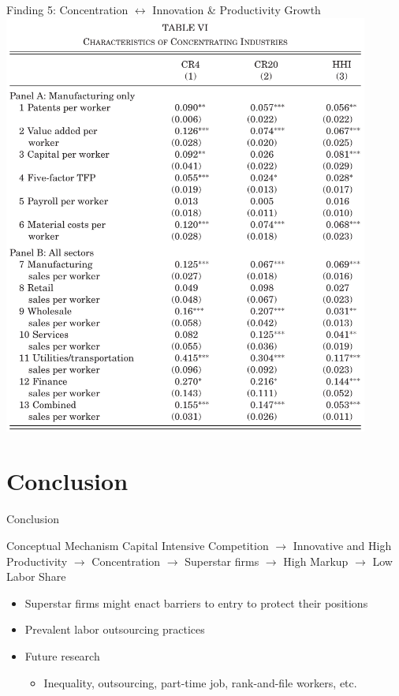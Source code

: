 \documentclass[
  10pt,
  ignorenonframetext,
  aspectratio=43,
]{beamer}
\providecommand{\tightlist}{%
  \setlength{\itemsep}{0pt}\setlength{\parskip}{0pt}}
\begin{document}
\begin{frame}{Finding 5: Concentration \(\leftrightarrow\) Innovation \&
Productivity Growth}
\protect\hypertarget{finding-5-concentration-leftrightarrow-innovation-productivity-growth}{}
\includegraphics[width=0.9\textwidth,height=\textheight]{./images/Pasted image 20220516212926.png}\\
\end{frame}

\hypertarget{conclusion}{%
\section{Conclusion}\label{conclusion}}

\begin{frame}{Conclusion}
\begin{block}{Conceptual Mechanism}
\protect\hypertarget{conceptual-mechanism}{}
Capital Intensive Competition \(\rightarrow\) Innovative and High
Productivity \(\rightarrow\) Concentration \(\rightarrow\) Superstar
firms \(\rightarrow\) High Markup \(\rightarrow\) Low Labor Share

\begin{itemize}
\tightlist
\item
  Superstar firms might enact barriers to entry to protect their
  positions
\item
  Prevalent labor outsourcing practices
\item
  Future research

  \begin{itemize}
  \tightlist
  \item
    Inequality, outsourcing, part-time job, rank-and-file workers, etc.
  \end{itemize}
\end{itemize}
\end{block}
\end{frame}
\end{document}
